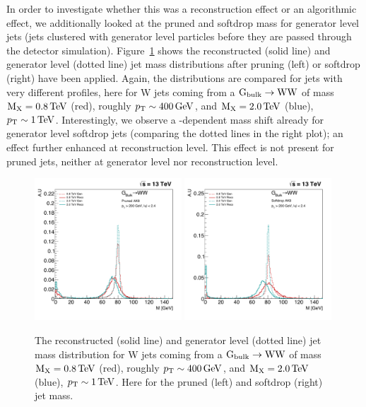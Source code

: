 In order to investigate whether this was a reconstruction effect or an algorithmic effect, we additionally looked at the pruned and softdrop mass for generator level jets (jets clustered with generator level particles before they are passed through the detector simulation). Figure~\ref{fig:searchI:grommedmassshift_genvsreco} shows the reconstructed (solid line) and generator level (dotted line) jet mass distributions after pruning (left) or softdrop (right) have been applied. Again, the distributions are compared for jets with very different \PT profiles, here for W jets coming from a $\mathrm{G}_\mathrm{bulk} \rightarrow \mathrm{W}\mathrm{W}$ of mass $\text{M}_{\text{X}} = 0.8 \,\text{Te\hspace{-.08em}V}$ (red), roughly $p_{\mathrm{T}}\sim 400 \,\text{Ge\hspace{-.08em}V}$, and $\text{M}_{\text{X}} = 2.0 \,\text{Te\hspace{-.08em}V}$ (blue), $p_{\mathrm{T}}\sim 1 \,\text{Te\hspace{-.08em}V}$.
Interestingly, we observe a \PT-dependent mass shift already for generator level softdrop jets (comparing the dotted lines in the right plot); an effect further enhanced at reconstruction level. This effect is not present for pruned jets, neither at generator level nor reconstruction level.


\begin{figure}[h!]
\centering
\includegraphics[width=0.49\textwidth]{figures/analysis/search1/misc/pruned_mass_shift_genvsreco.pdf}
\includegraphics[width=0.49\textwidth]{figures/analysis/search1/misc/softdrop_mass_shift_genvsreco.pdf}
\caption{The reconstructed (solid line) and generator level (dotted line) jet mass distribution for W jets coming from a $\mathrm{G}_\mathrm{bulk} \rightarrow \mathrm{W}\mathrm{W}$ of mass $\text{M}_{\text{X}} = 0.8 \,\text{Te\hspace{-.08em}V}$ (red), roughly $p_{\mathrm{T}}\sim 400 \,\text{Ge\hspace{-.08em}V}$, and $\text{M}_{\text{X}} = 2.0 \,\text{Te\hspace{-.08em}V}$ (blue), $p_{\mathrm{T}}\sim 1 \,\text{Te\hspace{-.08em}V}$. Here for the pruned (left) and softdrop (right) jet mass.}
\label{fig:searchI:grommedmassshift_genvsreco}
\end{figure}

